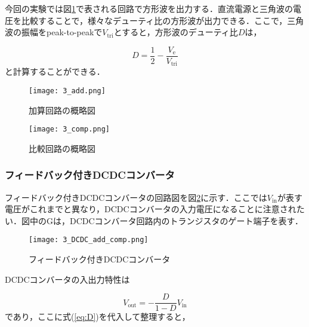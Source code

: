 \documentclass[1_power_supply.tex]{subfiles}
\begin{document}
      今回の実験では図\ref{fig:3_comp}で表される回路で方形波を出力する．直流電源と三角波の電圧を比較することで，様々なデューティ比の方形波が出力できる．ここで，三角波の振幅をpeak-to-peakで$V_\mathrm{tri}$とすると，方形波のデューティ比$D$は，

      \begin{equation}
        D = \frac{1}{2}-\frac{V_\mathrm{e}}{V_\mathrm{tri}} \label{eq:D}
      \end{equation}
      と計算することができる．


      \begin{figure}[htbp]
        \begin{minipage}{0.45\columnwidth}
          \centering
          \texttt{[image: 3\_add.png]}
          \caption{加算回路の概略図}\label{fig:3_add}
        \end{minipage}
        \begin{minipage}{0.45\columnwidth}
          \centering
          \texttt{[image: 3\_comp.png]}
          \caption{比較回路の概略図}\label{fig:3_comp}
        \end{minipage}
      \end{figure}

    \subsubsection{フィードバック付きDCDCコンバータ}

      フィードバック付きDCDCコンバータの回路図を図\ref{fig:3_DCDC_add_comp}に示す．ここでは$V_\mathrm{in}$が表す電圧がこれまでと異なり，DCDCコンバータの入力電圧になることに注意されたい．図中のGは，DCDCコンバータ回路内のトランジスタのゲート端子を表す．


      \begin{figure}[htbp]
        \begin{center}
          \texttt{[image: 3\_DCDC\_add\_comp.png]}
          \caption{フィードバック付きDCDCコンバータ}\label{fig:3_DCDC_add_comp}
        \end{center}
      \end{figure}

      DCDCコンバータの入出力特性は

      \begin{equation}
        V_\mathrm{out} = -\frac{D}{1-D}V_\mathrm{in}
      \end{equation}
      であり，ここに式(\ref{eq:D})を代入して整理すると，
\end{document}
